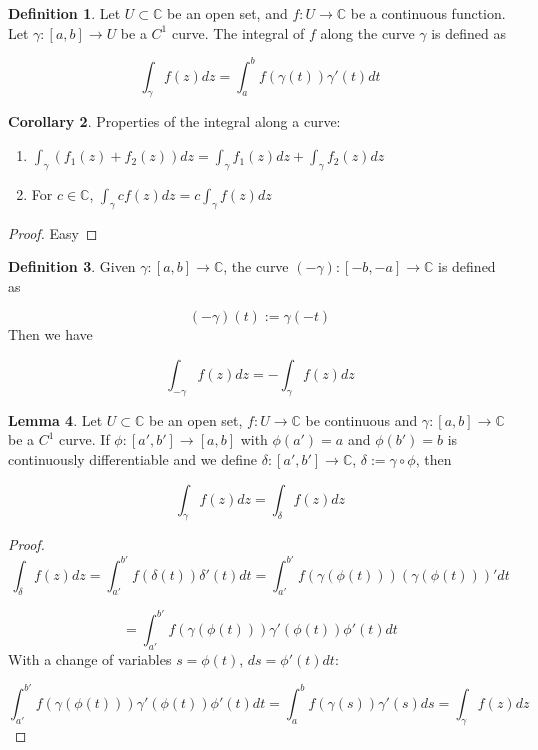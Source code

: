 \documentclass[12pt,a4paper]{article}
\theoremstyle{definition}
\newtheorem{definition}{Definition}[subsection]
\newtheorem{corollary}[definition]{Corollary}
\newtheorem{lemma}[definition]{Lemma}
\begin{document}
\begin{definition}
	Let $U \subset \mathbb{C}$ be an open set, and $f: U \rightarrow \mathbb{C}$ be a continuous function. Let $\gamma: [a, b] \rightarrow U$ be a $C^1$ curve. The integral of $f$ along the curve $\gamma$ is defined as

	\[ \int_{\gamma} f(z) dz = \int_a^b f(\gamma(t)) \gamma'(t) dt \]
\end{definition}

\begin{corollary}
	Properties of the integral along a curve:
	\begin{enumerate}
		\item $\int_{\gamma} (f_1(z) + f_2(z)) dz = \int_{\gamma} f_1(z) dz + \int_{\gamma} f_2(z) dz$
		\item For $c \in \mathbb{C}$, $\int_{\gamma} c f(z) dz = c \int_{\gamma} f(z) dz$
	\end{enumerate}
\end{corollary}

\begin{proof}
	Easy
\end{proof}

\begin{definition}
	Given $\gamma: [a, b] \rightarrow \mathbb{C}$, the curve $(-\gamma): [-b, -a] \rightarrow \mathbb{C}$ is defined as
	
	\[ (-\gamma)(t) := \gamma(-t) \] Then we have
	
	\[ \int_{-\gamma} f(z) dz = -\int_{\gamma} f(z) dz \]
\end{definition}

\begin{lemma}
	Let $U \subset \mathbb{C}$ be an open set, $f: U \rightarrow \mathbb{C}$ be continuous and $\gamma: [a, b] \rightarrow \mathbb{C}$ be a $C^1$ curve. If $\phi: [a', b'] \rightarrow [a, b]$ with $\phi(a') = a$ and $\phi(b') = b$ is continuously differentiable and we define $\delta: [a', b'] \rightarrow \mathbb{C}$, $\delta := \gamma \circ \phi$, then

	\[ \int_{\gamma} f(z) dz = \int_{\delta} f(z) dz \]
\end{lemma}

\begin{proof}
	\[\int_{\delta} f(z) dz = \int_{a'}^{b'} f(\delta(t)) \delta'(t) dt = \int_{a'}^{b'} f(\gamma(\phi(t))) (\gamma(\phi(t)))' dt\]
	
	\[ = \int_{a'}^{b'} f(\gamma(\phi(t))) \gamma'(\phi(t)) \phi'(t) dt\]
	With a change of variables $s = \phi(t)$, $ds = \phi'(t) dt$:

	\[ \int_{a'}^{b'} f(\gamma(\phi(t))) \gamma'(\phi(t)) \phi'(t) dt = \int_a^b f(\gamma(s)) \gamma'(s) ds = \int_{\gamma} f(z) dz \]
\end{proof}
\end{document}
